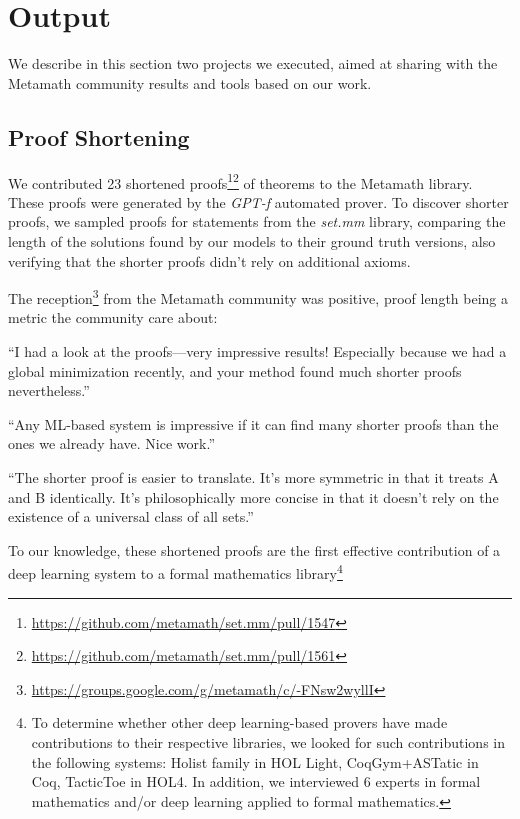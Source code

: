 \section{Output}

We describe in this section two projects we executed, aimed at sharing with the Metamath community results and tools based on our work.

\subsection{Proof Shortening}

We contributed 23 shortened proofs\footnote{\url{https://github.com/metamath/set.mm/pull/1547}}\footnote{\url{https://github.com/metamath/set.mm/pull/1561}} of theorems to the Metamath library. These proofs were generated by the \textit{GPT-f} automated prover. To discover shorter proofs, we sampled proofs for statements from the \textit{set.mm} library, comparing the length of the solutions found by our models to their ground truth versions, also verifying that the shorter proofs didn't rely on additional axioms.

The reception\footnote{\url{https://groups.google.com/g/metamath/c/-FNsw2wyllI}} from the Metamath community was positive, proof length being a metric the community care about:

\begin{displayquote}
“I had a look at the proofs—very impressive results! Especially because we had a global minimization recently, and your method found much shorter proofs nevertheless.”
\end{displayquote}

\begin{displayquote}
“Any ML-based system is impressive if it can find many shorter proofs than the ones we already have. Nice work.”
\end{displayquote}

\begin{displayquote}
“The shorter proof is easier to translate. It’s more symmetric in that it treats A and B identically. It’s philosophically more concise in that it doesn’t rely on the existence of a universal class of all sets.”
\end{displayquote}

To our knowledge, these shortened proofs are the first effective contribution of a deep learning system to a formal mathematics library\footnote{To determine whether other deep learning-based provers have made contributions to their respective libraries, we looked for such contributions in the following systems: Holist family in HOL Light, CoqGym+ASTatic in Coq, TacticToe in HOL4. In addition, we interviewed 6 experts in formal mathematics and/or deep learning applied to formal mathematics.}

